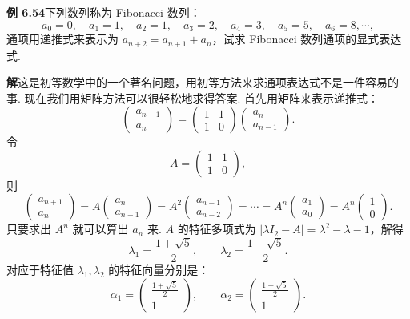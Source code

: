 \documentclass[UTF8,12pt,a4paper,fontset=fandol]{ctexart}
\begin{document}
\noindent\textbf{例 6.54}\quad 下列数列称为 Fibonacci 数列：
\[
a_0=0,\quad a_1=1,\quad a_2=1,\quad a_3=2,\quad a_4=3,\quad a_5=5,\quad a_6=8,\cdots,
\]
通项用递推式来表示为 $a_{n+2}=a_{n+1}+a_n$，试求 Fibonacci 数列通项的显式表达式.

\noindent\textbf{解}\quad 这是初等数学中的一个著名问题，用初等方法来求通项表达式不是一件容易的事. 现在我们用矩阵方法可以很轻松地求得答案. 首先用矩阵来表示递推式：
\[
\left(\begin{array}{c}
a_{n+1}\\
a_n
\end{array}\right)
=\left(\begin{array}{cc}
1 & 1\\
1 & 0
\end{array}\right)
\left(\begin{array}{c}
a_n\\
a_{n-1}
\end{array}\right).
\]
令
\[
A=\left(\begin{array}{cc}
1 & 1\\
1 & 0
\end{array}\right),
\]
则
\[
\left(\begin{array}{c}
a_{n+1}\\
a_n
\end{array}\right)
=A\left(\begin{array}{c}
a_n\\
a_{n-1}
\end{array}\right)
=A^2\left(\begin{array}{c}
a_{n-1}\\
a_{n-2}
\end{array}\right)
=\cdots
=A^n\left(\begin{array}{c}
a_1\\
a_0
\end{array}\right)
=A^n\left(\begin{array}{c}
1\\
0
\end{array}\right).
\]
只要求出 $A^n$ 就可以算出 $a_n$ 来. $A$ 的特征多项式为 $|\lambda I_2-A|=\lambda^2-\lambda-1$，解得
\[
\lambda_1=\frac{1+\sqrt{5}}{2},\qquad
\lambda_2=\frac{1-\sqrt{5}}{2}.
\]
对应于特征值 $\lambda_1,\lambda_2$ 的特征向量分别是：
\[
\alpha_1=\left(\begin{array}{c}
\frac{1+\sqrt{5}}{2}\\
1
\end{array}\right),\qquad
\alpha_2=\left(\begin{array}{c}
\frac{1-\sqrt{5}}{2}\\
1
\end{array}\right).
\]
\end{document}
